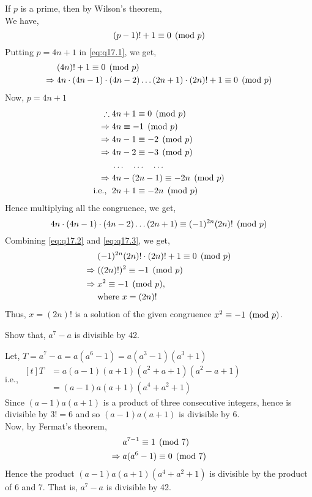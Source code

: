 \documentclass[12pt]{book}
\begin{document}
\begin{soln}
    If $ p $ is a prime, then by Wilson's theorem,\\
    We have,
    \begin{equation}
        (p-1)!+1\equiv 0 \pmod{p}\label{eq:q17.1}
    \end{equation}
    Putting $ p=4n+1 $ in \eqref{eq:q17.1}, we get,
    \begin{align}
        & (4n)!+1\equiv 0 \pmod{p}\notag\\
        \Rightarrow\;& 4n\cdot(4n-1)\cdot(4n-2)\dots(2n+1)\cdot(2n)!+1\equiv 0 \pmod{p}\label{eq:q17.2}
    \end{align}
    Now, $ p=4n+1 $
    \begin{align*}
        \therefore\;&4n+1\equiv 0 \pmod{p}\\
        \Rightarrow\;&4n\equiv -1 \pmod{p}\\
        \Rightarrow\;&4n-1 \equiv -2 \pmod{p}\\
        \Rightarrow\;&4n-2 \equiv -3 \pmod{p}\\
        &\dots\quad \dots\quad \dots\\
        \Rightarrow\;&4n-(2n-1) \equiv -2n \pmod{p}\\
        \text{i.e., }\;&2n+1 \equiv -2n \pmod{p}
    \end{align*}
    Hence multiplying all the congruence, we get,
    \begin{equation}
        4n\cdot(4n-1)\cdot(4n-2)\dots(2n+1)\equiv (-1)^{2n}(2n)! \pmod{p}\label{eq:q17.3}
    \end{equation}
    Combining \eqref{eq:q17.2} and \eqref{eq:q17.3}, we get,
    \begin{align*}
        & (-1)^{2n} (2n)!\cdot(2n)!+1\equiv 0 \pmod{p}\\
        \Rightarrow\;& ((2n)!)^2 \equiv -1 \pmod{p}\\
        \Rightarrow\;& x^2 \equiv -1 \pmod{p},\\
        &\text{where } x=(2n)!
    \end{align*}
    Thus, $ x=(2n)! $ is a solution of the given congruence $ x^2\equiv -1 \pmod{p} $.
\end{soln}
\begin{qn}
    Show that, $ a^7-a $ is divisible by 42.
\end{qn}
\begin{soln}
    Let, $ T=a^7-a=a(a^6-1)=a(a^3-1)(a^3+1) $\\
    i.e., $ \begin{aligned}[t]
        T&= a(a-1)(a+1)(a^2+a+1)(a^2-a+1)\\
        &= (a-1)a(a+1)(a^4+a^2+1)
    \end{aligned} $\\
    Since $ (a-1)a(a+1) $ is a product of three consecutive integers, hence is divisible by $ 3!=6 $ and so $ (a-1)a(a+1) $ is divisible by 6.\\
    Now, by Fermat's theorem,
    \begin{align*}
        &a^{7-1} \equiv 1 \pmod{7}\\
        \Rightarrow\; &a(a^{6}-1) \equiv 0 \pmod{7}
    \end{align*}
    Hence the product $ (a-1)a(a+1)(a^4+a^2+1) $ is divisible by the product of $ 6 $ and 7. That is, $ a^7-a $ is divisible by 42.
\end{soln}
\end{document}
